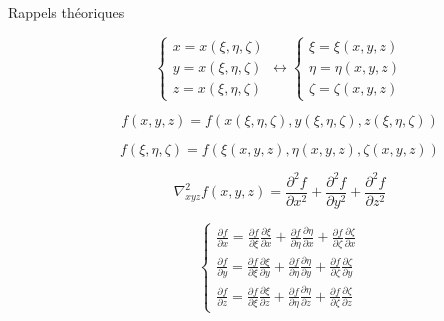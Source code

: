 \documentclass
[
a4paper,                      %
twoside,					  %
12pt,                         %
abstract,		      %
fleqn,                        %
]
{scrartcl} %
\begin{document}
\begin{description}

\item[Rappels th\'eoriques]

\begin{equation}
\begin{cases}
x=x\left(\xi,\eta,\zeta\right)\\
y=x\left(\xi,\eta,\zeta\right)\\
z=x\left(\xi,\eta,\zeta\right)
\end{cases}\longleftrightarrow\begin{cases}
\xi=\xi\left(x,y,z\right)\\
\eta=\eta\left(x,y,z\right)\\
\zeta=\zeta\left(x,y,z\right)
\end{cases}
\end{equation}

\begin{equation}
f\left(x,y,z\right)=f\left(x\left(\xi,\eta,\zeta\right),y\left(\xi,\eta,\zeta\right),z\left(\xi,\eta,\zeta\right)\right)
\end{equation}

\begin{equation}
f\left(\xi,\eta,\zeta\right)=f\left(\xi\left(x,y,z\right),\eta\left(x,y,z\right),\zeta\left(x,y,z\right)\right)
\end{equation}

\begin{equation}
\nabla_{xyz}^{2}f\left(x,y,z\right)=\frac{\partial^{2} f}{\partial x^{2}}+\frac{\partial^{2} f}{\partial y^{2}}+\frac{\partial^{2} f}{\partial z^{2}}
\end{equation}

\begin{equation}
\begin{cases}
\frac{\partial f}{\partial x}=\frac{\partial f}{\partial\xi}\frac{\partial\xi}{\partial x}+\frac{\partial f}{\partial\eta}\frac{\partial\eta}{\partial x}+\frac{\partial f}{\partial\zeta}\frac{\partial\zeta}{\partial x}\\[5pt]
\frac{\partial f}{\partial y}=\frac{\partial f}{\partial\xi}\frac{\partial\xi}{\partial y}+\frac{\partial f}{\partial\eta}\frac{\partial\eta}{\partial y}+\frac{\partial f}{\partial\zeta}\frac{\partial\zeta}{\partial y}\\[5pt]
\frac{\partial f}{\partial z}=\frac{\partial f}{\partial\xi}\frac{\partial\xi}{\partial z}+\frac{\partial f}{\partial\eta}\frac{\partial\eta}{\partial z}+\frac{\partial f}{\partial\zeta}\frac{\partial\zeta}{\partial z}
\end{cases}
\end{equation}


\end{description}
\end{document}
